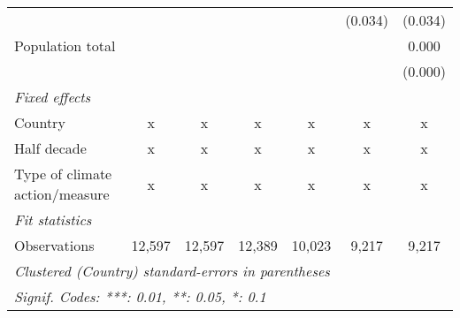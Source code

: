 \begin{tabular}{lcccccc}
                                                       &         &         &         &         & (0.034) & (0.034)\\   
   Population total                                    &         &         &         &         &         & 0.000\\   
                                                       &         &         &         &         &         & (0.000)\\   
   \emph{Fixed effects}\\
   Country                                             & x       & x       & x       & x       & x       & x\\  
   Half decade                                         & x       & x       & x       & x       & x       & x\\  
   Type of climate action/measure                      & x       & x       & x       & x       & x       & x\\  
   \midrule \emph{Fit statistics}\\
   Observations                                        & 12,597  & 12,597  & 12,389  & 10,023  & 9,217   & 9,217\\  
   \midrule
   \multicolumn{7}{l}{\emph{Clustered (Country) standard-errors in parentheses}}\\
   \multicolumn{7}{l}{\emph{Signif. Codes: ***: 0.01, **: 0.05, *: 0.1}}\\
\end{tabular}
\par\endgroup



